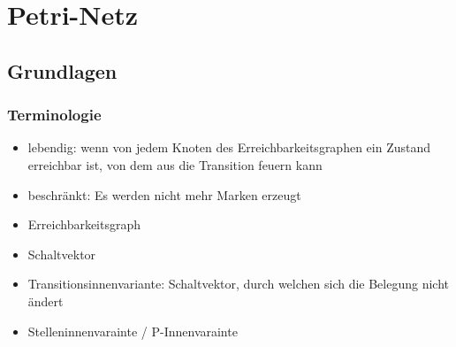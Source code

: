 \section{Petri-Netz}
\subsection{Grundlagen}
\subsubsection{Terminologie}
\begin{itemize}
	\item lebendig: wenn von jedem Knoten des Erreichbarkeitsgraphen ein Zustand erreichbar ist, von dem aus die Transition feuern kann
	\item beschränkt: Es werden nicht mehr Marken erzeugt
	\item Erreichbarkeitsgraph
	\item Schaltvektor
	\item Transitionsinnenvariante: Schaltvektor, durch welchen sich die Belegung nicht ändert
	\item Stelleninnenvarainte / P-Innenvarainte
\end{itemize}
